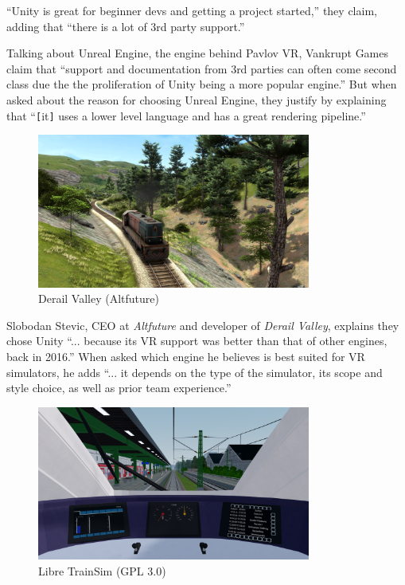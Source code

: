 “Unity is great for beginner devs and getting a project started,” they claim, adding that “there is a lot of 3rd party support.”

Talking about Unreal Engine, the engine behind Pavlov VR, Vankrupt Games claim that “support and documentation from 3rd parties can often come second class due the the proliferation of Unity being a more popular engine.” But when asked about the reason for choosing Unreal Engine, they justify by explaining that “\texttt{[}it\texttt{]} uses a lower level language and has a great rendering pipeline.”

\begin{figure}
    \vspace{12pt}
    \includegraphics[width=9cm]{figures/derailvalley.png}
    \caption{Derail Valley (Altfuture)}
\end{figure} 

Slobodan Stevic, CEO at \textit{Altfuture} and developer of \textit{Derail Valley}, explains they chose Unity “... because its VR support was better than that of other engines, back in 2016.” When asked which engine he believes is best suited for VR simulators, he adds “... it depends on the type of the simulator, its scope and style choice, as well as prior team experience.” 

\bigskip
\begin{figure}
    \vspace{12pt}
    \includegraphics[width=9cm]{figures/libre_train_sim.png}
    \caption{Libre TrainSim (GPL 3.0)}
\end{figure} 

